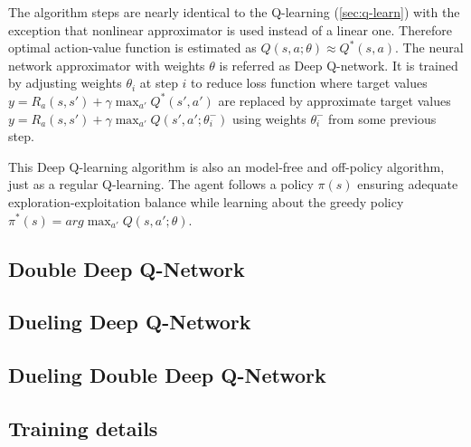 The algorithm steps are nearly identical to the Q-learning (\ref{sec:q-learn}) with the exception that nonlinear approximator is used instead of a linear one. Therefore optimal action-value function is estimated as $Q(s, a; \theta) \approx Q^*(s, a)$. The neural network approximator with weights $\theta$ is referred as Deep Q-network. It is trained by adjusting weights $\theta_i$ at step $i$ to reduce loss function where target values $y = R_a(s, s') + \gamma \max_{a'}Q^*(s', a')$ are replaced by approximate target values $y = R_a(s, s') + \gamma \max_{a'}Q(s', a';\theta^-_i)$ using weights $\theta^-_i$ from some previous step.

This Deep Q-learning algorithm is also an model-free and off-policy algorithm, just as a regular Q-learning. The agent follows a policy $\pi(s)$ ensuring adequate exploration-exploitation balance while learning about the greedy policy $\pi^*(s) = arg\max_{a'}Q(s, a'; \theta)$.

\subsection{Double Deep Q-Network}
\label{sub:double-deep-q-network}

\subsection{Dueling Deep Q-Network}
\label{sub:dueling-deep-q-network}

\subsection{Dueling Double Deep Q-Network}
\label{sub:dueling-double-deep-q-network}

\subsection{Training details}
\label{sub:training-details}


